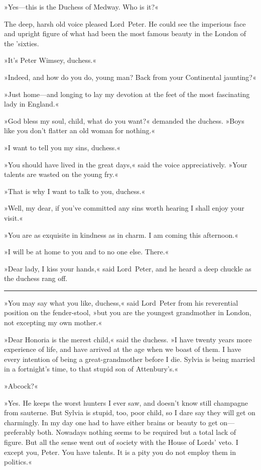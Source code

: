 »Yes—this is the Duchess of Medway. Who is it?«

The deep, harsh old voice pleased Lord~Peter. He could see the imperious face and upright figure of what had been the most famous beauty in the London of the 'sixties.

»It's Peter Wimsey, duchess.«

»Indeed, and how do you do, young man? Back from your Continental jaunting?«

»Just home—and longing to lay my devotion at the feet of the most fascinating lady in England.«

»God bless my soul, child, what do you want?« demanded the duchess. »Boys like you don't flatter an old woman for nothing.«

»I want to tell you my sins, duchess.«

»You should have lived in the great days,« said the voice appreciatively. »Your talents are wasted on the young fry.«

»That is why I want to talk to you, duchess.«

»Well, my dear, if you've committed any sins worth hearing I shall enjoy your visit.«

»You are as exquisite in kindness as in charm. I am coming this afternoon.«

»I will be at home to you and to no one else. There.«

»Dear lady, I kiss your hands,« said Lord~Peter, and he heard a deep chuckle as the duchess rang off.

\noindent\hfil\rule{0.5\textwidth}{.4pt}\hfil 

»You may say what you like, duchess,« said Lord~Peter from his reverential position on the fender-stool, »but you are the youngest grandmother in London, not excepting my own mother.«

»Dear Honoria is the merest child,« said the duchess. »I have twenty years more experience of life, and have arrived at the age when we boast of them. I have every intention of being a great-grandmother before I die. Sylvia is being married in a fortnight's time, to that stupid son of Attenbury's.«

»Abcock?«

»Yes. He keeps the worst hunters I ever saw, and doesn't know still champagne from sauterne. But Sylvia is stupid, too, poor child, so I dare say they will get on charmingly. In my day one had to have either brains or beauty to get on—preferably both. Nowadays nothing seems to be required but a total lack of figure. But all the sense went out of society with the House of Lords' veto. I except you, Peter. You have talents. It is a pity you do not employ them in politics.«

